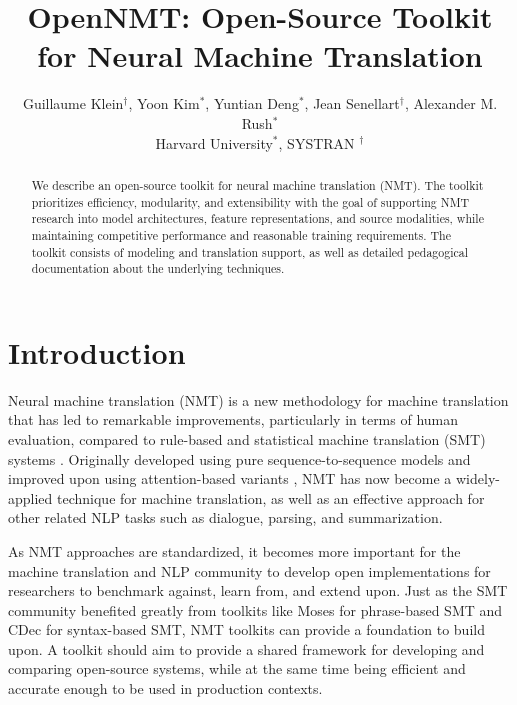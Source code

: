 \documentclass[11pt,a4paper]{article}
\title{OpenNMT: Open-Source Toolkit for Neural Machine Translation}
\author{Guillaume Klein$^\dagger$, Yoon Kim$^*$, Yuntian Deng$^*$, Jean Senellart$^\dagger$, Alexander M. Rush$^*$ \\ Harvard University$^*$, SYSTRAN $^\dagger$}
\date{}
\begin{document}
\maketitle
\begin{abstract}

  We describe an open-source toolkit for neural machine translation
  (NMT).  The toolkit prioritizes efficiency, modularity, and
  extensibility with the goal of supporting NMT research into model
  architectures, feature representations, and source modalities, while
  maintaining competitive performance and reasonable training
  requirements. The toolkit consists of modeling and translation support,
  as well as detailed pedagogical documentation about the underlying
  techniques.

\end{abstract}

\section{Introduction}


Neural machine translation (NMT) is a new methodology for machine
translation that has led to remarkable improvements, particularly in
terms of human evaluation, compared to rule-based
and statistical machine translation (SMT) systems
\cite{wu2016google,systran}. Originally developed using pure
sequence-to-sequence models \cite{sutskever14sequence,Cho2014} and
improved upon using attention-based variants \cite{Bahdanau2015,Luong2015}, NMT has now become a widely-applied technique for machine
translation, as well as an effective approach for other related NLP
tasks such as dialogue, parsing, and summarization.

As NMT approaches are standardized, it becomes more important for the
machine translation and NLP community to develop open implementations
for researchers to benchmark against, learn from, and extend
upon. Just as the SMT community benefited greatly from toolkits like
Moses \cite{koehn2007moses} for phrase-based SMT and CDec
\cite{dyer2010cdec} for syntax-based SMT, NMT toolkits can provide a
foundation to build upon. A toolkit should aim to provide
a shared framework for developing and comparing open-source systems,
while at the same time being efficient and accurate enough to be used
in production contexts.
\end{document}
